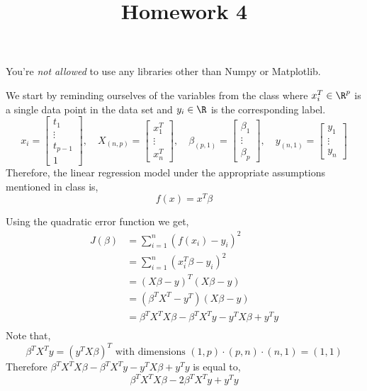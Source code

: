 \documentclass{homework}
\title{Homework 4}
\begin{document}
 \maketitle

You're \textit{not allowed} to use any libraries other than Numpy or
Matplotlib.

We start by reminding ourselves of the variables from the class where
$x_i^T \in \R^p$ is a single data point in the data set and
$y_i\in \R$ is the corresponding label.
\[
  x_i =
  \begin{bmatrix}
    t_1 \\ \vdots \\ t_{p-1} \\ 1
  \end{bmatrix},
  \quad
  X_{(n, p)} =
  \begin{bmatrix}
    x^T_1 \\ \vdots \\ x^T_n
  \end{bmatrix},
  \quad
  \beta_{(p, 1)} =
  \begin{bmatrix}
    \beta_1 \\ \vdots \\ \beta_p
  \end{bmatrix},
  \quad
  y_{(n, 1)} =
  \begin{bmatrix}
    y_1 \\ \vdots \\ y_n
  \end{bmatrix}
\]
Therefore, the linear regression model under the appropriate
assumptions mentioned in class is,
\[
  f(x) = x^T\beta
\]

Using the quadratic error function we get,
\begin{align*}
  J(\beta) & = \sum_{i=1}^n(f(x_i) - y_{i})^2                    \\
           & = \sum_{i=1}^n(x_i^T\beta - y_{i})^2                \\
           & = (X\beta - y)^T(X\beta - y)                        \\
           & = (\beta^TX^T - y^T)(X\beta - y)                    \\
           & = \beta^TX^TX\beta - \beta^TX^Ty - y^TX\beta + y^Ty \\
\end{align*}
Note that,
\[
  \beta^TX^Ty = (y^TX\beta)^T
  \text{ with dimensions }
  (1, p) \cdot (p, n) \cdot (n, 1) = (1, 1)
\]
Therefore $ \beta^TX^TX\beta - \beta^TX^Ty - y^TX\beta + y^Ty$ is
equal to,
\[
  \beta^TX^TX\beta - 2\beta^TX^Ty + y^Ty
\]
\end{document}
